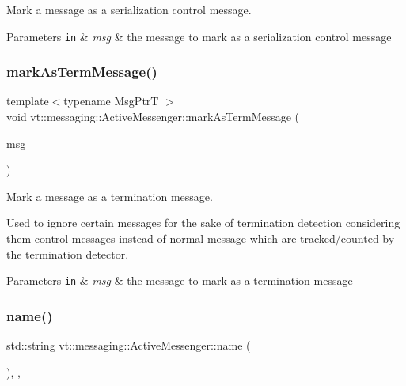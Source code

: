Mark a message as a serialization control message. 


\begin{DoxyParams}[1]{Parameters}
\mbox{\tt in}  & {\em msg} & the message to mark as a serialization control message \\
\hline
\end{DoxyParams}
\mbox{\label{structvt_1_1messaging_1_1_active_messenger_ad76f4f0ee9830f4431b57720163f715c}} 
\subsubsection{\texorpdfstring{mark\+As\+Term\+Message()}{markAsTermMessage()}}
{\footnotesize\ttfamily template$<$typename Msg\+PtrT $>$ \\
void vt\+::messaging\+::\+Active\+Messenger\+::mark\+As\+Term\+Message (\begin{DoxyParamCaption}\item[{Msg\+PtrT const}]{msg }\end{DoxyParamCaption})}



Mark a message as a termination message. 

Used to ignore certain messages for the sake of termination detection considering them control messages instead of normal message which are tracked/counted by the termination detector.


\begin{DoxyParams}[1]{Parameters}
\mbox{\tt in}  & {\em msg} & the message to mark as a termination message \\
\hline
\end{DoxyParams}
\mbox{\label{structvt_1_1messaging_1_1_active_messenger_a42112dea411907ca529bd5bc6586249a}} 
\subsubsection{\texorpdfstring{name()}{name()}}
{\footnotesize\ttfamily std\+::string vt\+::messaging\+::\+Active\+Messenger\+::name (\begin{DoxyParamCaption}{ }\end{DoxyParamCaption})\hspace{0.3cm}{\ttfamily [inline]}, {\ttfamily [override]}, {\ttfamily [virtual]}}



